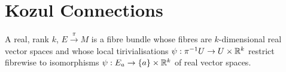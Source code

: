 \documentclass{article}
\begin{document}
\section{Kozul Connections}
\begin{definition}
A real, rank $k$,  $E \overset{\pi}{\to}M$ is a fibre bundle whose fibres are $k$-dimensional real vector spaces and whose local tirivialisations $\psi:\pi^{-1}U \to U \times \mathbb{R}^k$ restrict fibrewise to isomorphisms $\psi : E_a \to \left\{ a \right\} \times \mathbb{R}^k$ of real vector spaces. 
\end{definition}
\end{document}
